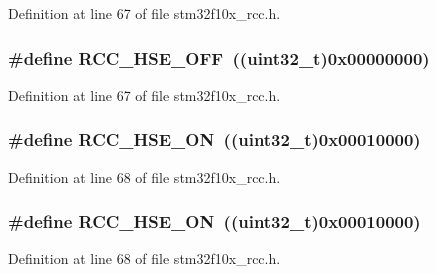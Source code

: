 Definition at line 67 of file stm32f10x\+\_\+rcc.\+h.

\subsubsection[{\texorpdfstring{R\+C\+C\+\_\+\+H\+S\+E\+\_\+\+O\+FF}{RCC_HSE_OFF}}]{\setlength{\rightskip}{0pt plus 5cm}\#define R\+C\+C\+\_\+\+H\+S\+E\+\_\+\+O\+FF~(({\bf uint32\+\_\+t})0x00000000)}\hypertarget{group___h_s_e__configuration_ga1616626d23fbce440398578855df6f97}{}\label{group___h_s_e__configuration_ga1616626d23fbce440398578855df6f97}


Definition at line 67 of file stm32f10x\+\_\+rcc.\+h.

\subsubsection[{\texorpdfstring{R\+C\+C\+\_\+\+H\+S\+E\+\_\+\+ON}{RCC_HSE_ON}}]{\setlength{\rightskip}{0pt plus 5cm}\#define R\+C\+C\+\_\+\+H\+S\+E\+\_\+\+ON~(({\bf uint32\+\_\+t})0x00010000)}\hypertarget{group___h_s_e__configuration_gabc4f70a44776c557af20496b04d9a9db}{}\label{group___h_s_e__configuration_gabc4f70a44776c557af20496b04d9a9db}


Definition at line 68 of file stm32f10x\+\_\+rcc.\+h.

\subsubsection[{\texorpdfstring{R\+C\+C\+\_\+\+H\+S\+E\+\_\+\+ON}{RCC_HSE_ON}}]{\setlength{\rightskip}{0pt plus 5cm}\#define R\+C\+C\+\_\+\+H\+S\+E\+\_\+\+ON~(({\bf uint32\+\_\+t})0x00010000)}\hypertarget{group___h_s_e__configuration_gabc4f70a44776c557af20496b04d9a9db}{}\label{group___h_s_e__configuration_gabc4f70a44776c557af20496b04d9a9db}


Definition at line 68 of file stm32f10x\+\_\+rcc.\+h.

